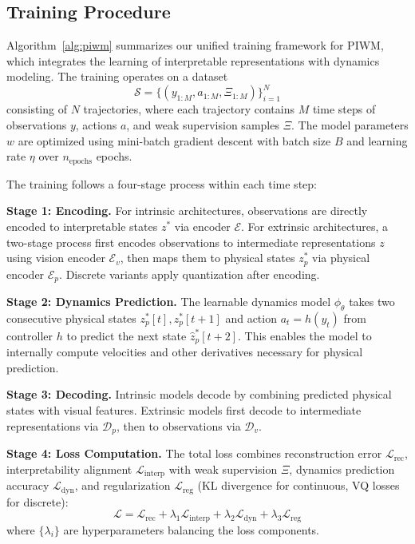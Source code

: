 \documentclass[sigconf]{acmart}
\begin{document}
\subsection{Training Procedure}

Algorithm~\ref{alg:piwm} summarizes our unified training framework for PIWM, which integrates the learning of interpretable representations with dynamics modeling. The training operates on a dataset $$\mathcal{S} = \{(y_{1:M}, a_{1:M}, \Xi_{1:M})\}_{i=1}^N$$ consisting of $N$ trajectories, where each trajectory contains $M$ time steps of observations $y$, actions $a$, and weak supervision samples $\Xi$. The model parameters $w$ are optimized using mini-batch gradient descent with batch size $B$ and learning rate $\eta$ over $n_{\text{epochs}}$ epochs.

The training follows a four-stage process within each time step:

\textbf{Stage 1: Encoding.} For intrinsic architectures, observations are directly encoded to interpretable states $z^*$ via encoder $\mathcal{E}$. For extrinsic architectures, a two-stage process first encodes observations to intermediate representations $z$ using vision encoder $\mathcal{E}_v$, then maps them to physical states $z^*_p$ via physical encoder $\mathcal{E}_p$. Discrete variants apply quantization after encoding.

\textbf{Stage 2: Dynamics Prediction.} The learnable dynamics model $\phi_\theta$ takes two consecutive physical states $z^*_p[t], z^*_p[t+1]$ and action $a_t = h(y_t)$ from controller $h$ to predict the next state $\hat{z}^*_p[t+2]$. This enables the model to internally compute velocities and other derivatives necessary for physical prediction.

\textbf{Stage 3: Decoding.} Intrinsic models decode by combining predicted physical states with visual features. Extrinsic models first decode to intermediate representations via $\mathcal{D}_p$, then to observations via $\mathcal{D}_v$.

\textbf{Stage 4: Loss Computation.} The total loss combines reconstruction error $\mathcal{L}_{\text{rec}}$, interpretability alignment $\mathcal{L}_{\text{interp}}$ with weak supervision $\Xi$, dynamics prediction accuracy $\mathcal{L}_{\text{dyn}}$, and regularization $\mathcal{L}_{\text{reg}}$ (KL divergence for continuous, VQ losses for discrete):
\begin{equation}
    \mathcal{L} = \mathcal{L}_{\text{rec}} + \lambda_1 \mathcal{L}_{\text{interp}} + \lambda_2 \mathcal{L}_{\text{dyn}} + \lambda_3 \mathcal{L}_{\text{reg}}
\end{equation}
where $\{\lambda_i\}$ are hyperparameters balancing the loss components.
\end{document}
